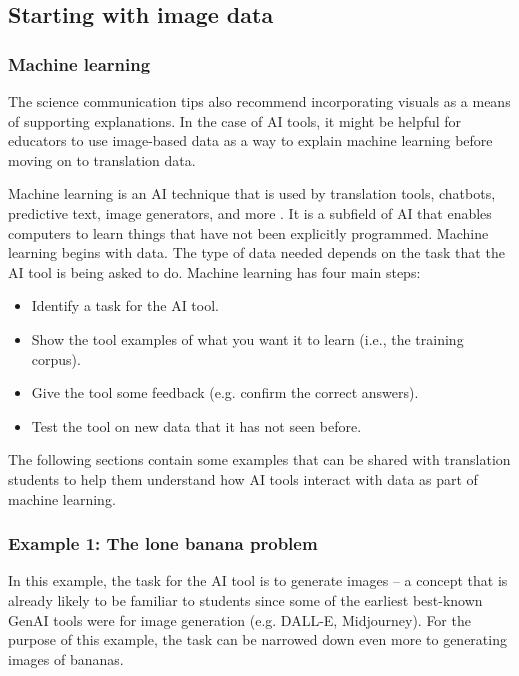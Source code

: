 \documentclass[output=paper]{langscibook}
\begin{document}
\subsection{Starting with image data}\label{sec:4:4.3}

\subsubsection{Machine learning}\label{sec:4:4.3.1}
The science communication tips also recommend incorporating visuals as a means of supporting explanations. In the case of AI tools, it might be helpful for educators to use image-based data as a way to explain machine learning before moving on to translation data.

Machine learning is an AI technique that is used by translation tools, chatbots, predictive text, image generators, and more \citep{flach12}. It is a subfield of AI that enables computers to learn things that have not been explicitly programmed. Machine learning begins with data. The type of data needed depends on the task that the AI tool is being asked to do. Machine learning has four main steps:

\begin{itemize}
\item Identify a task for the AI tool.
\item Show the tool examples of what you want it to learn (i.e., the training corpus).
\item Give the tool some feedback (e.g. confirm the correct answers).
\item Test the tool on new data that it has not seen before.
\end{itemize}
The following sections contain some examples that can be shared with translation students to help them understand how AI tools interact with data as part of machine learning.

\subsubsection{Example 1: The lone banana problem}\label{sec:4:4.3.2}

In this example, the task for the AI tool is to generate images – a concept that is already likely to be familiar to students since some of the earliest best-known GenAI tools were for image generation (e.g. DALL-E, Midjourney). For the purpose of this example, the task can be narrowed down even more to generating images of bananas.
\end{document}
